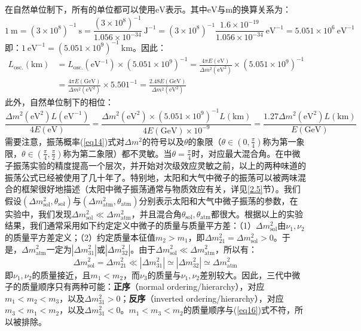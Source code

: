 \documentclass{article}
\begin{document}
		在自然单位制下，所有的单位都可以使用$\mathrm{eV}$表示。其中$\mathrm{eV}$与$\mathrm{m}$的换算关系为：
		\begin{equation*}
			1\ \mathrm{m}=(3\times 10^8)^{-1}\ \mathrm{s}=\frac{(3\times10^8)^{-1}}{1.056\times10^{-34}}\ \mathrm{J}^{-1}=(3\times10^{8})^{-1}\frac{1.6\times10^{-19}}{1.056\times10^{-34}}\ \mathrm{eV}^{-1}=5.051\times 10^6\ \mathrm{eV}^{-1}
		\end{equation*}
		即：$1\ \mathrm{eV}^{-1}=(5.051\times10^9)^{-1}\ \mathrm{km}$。因此：
		\begin{equation*}
			\begin{aligned}
				L_\mathrm{osc.}(\mathrm{km})&=L_\mathrm{osc.}(\mathrm{eV}^{-1})\times (5.051\times10^9)^{-1}=\frac{4\pi E(\mathrm{eV})}{\Delta m^2(\mathrm{eV}^{2})}\times (5.051\times10^9)^{-1}\\
				&=\frac{4\pi E(\mathrm{GeV})}{\Delta m^2(\mathrm{eV}^{2})}\times5.501^{-1}=\frac{2.48E(\mathrm{GeV})}{\Delta m^2(\mathrm{eV}^2)}
			\end{aligned}
		\end{equation*}
		此外，自然单位制下的相位：
		\begin{equation*}
			\frac{\Delta m^2(\mathrm{eV}^2)L(\mathrm{eV}^{-1})}{4E(\mathrm{eV})}=\frac{\Delta m^2(\mathrm{eV}^2)\times(5.051\times10^9)^{-1}L(\mathrm{km})}{4E(\mathrm{GeV})\times10^{-9}}=\frac{1.27\Delta m^2(\mathrm{eV}^2)L(\mathrm{km})}{E(\mathrm{GeV})}
		\end{equation*}
		需要注意，振荡概率(\ref{eq14})式对$\Delta m^2$的符号以及$\theta$的象限（$\theta\in(0,\frac{\pi}{4})$称为第一象限，$\theta\in(\frac{\pi}{4},\frac{\pi}{2})$称为第二象限）都不灵敏。当$\theta=\frac{\pi}{4}$时，对应最大混合角。在中微子振荡实验的精度提高一个层次，并开始对次级效应灵敏之前，以上的两种味道的振荡公式已经被使用了几十年了。特别地，太阳和大气中微子的振荡可以被两味混合的框架很好地描述（太阳中微子振荡通常与物质效应有关，详见\ref{2.5}节）。我们假设$(\Delta m_\mathrm{sol}^2,\theta_\mathrm{sol})$与$(\Delta m_\mathrm{atm}^2,\theta_\mathrm{atm})$分别表示太阳和大气中微子振荡的参数，在实验中，我们发现$\Delta m_\mathrm{sol}^2\ll\Delta m_\mathrm{atm}^2$，并且混合角$\theta_\mathrm{sol},\theta_\mathrm{atm}$都很大。根据以上的实验结果，我们通常采用如下约定定义中微子的质量与质量平方差：（1）$\Delta m_\mathrm{sol}^2$由$\nu_1,\nu_2$的质量平方差定义；（2）约定质量本征值$m_2>m_1$，即$\Delta m_{21}^2=\Delta m_\mathrm{sol}^2>0$。于是，$\Delta m_\mathrm{atm}^2$一定为$|\Delta m_{31}^2|$或$|\Delta m_{32}^2|$。由于$\Delta m_\mathrm{sol}^2\ll\Delta m_\mathrm{atm}^2$，所以有：
		\begin{equation}
			\Delta m_\mathrm{sol}^2=\Delta m_{21}^2\ll|\Delta m_{31}^2|\simeq|\Delta m_{32}^2|\simeq\Delta m_\mathrm{atm}^2
			\label{eq16}
		\end{equation}
		即$\nu_1,\nu_2$的质量接近，且$m_1<m_2$，而$\nu_3$的质量与$\nu_1,\nu_2$差别较大。因此，三代中微子的质量顺序只有两种可能：\textbf{正序}（normal ordering/hierarchy），对应$m_1<m_2<m_3$，以及$\Delta m_{31}^2>0$；\textbf{反序}（inverted ordering/hierarchy），对应$m_3<m_1<m_2$，以及$\Delta m_{31}^2<0$。$m_1<m_3<m_2$的质量顺序与(\ref{eq16})式不符，所以被排除。
		
\end{document}
